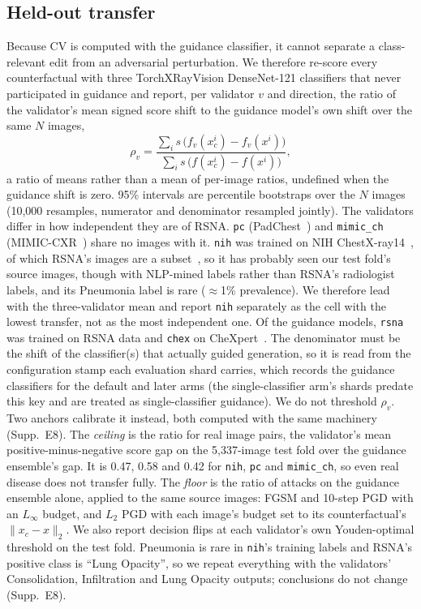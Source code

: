 \subsection{Held-out transfer}
\label{sec:transfer}

Because CV is computed with the guidance classifier, it cannot separate a class-relevant edit from an adversarial perturbation. We therefore re-score every counterfactual with three TorchXRayVision DenseNet-121 classifiers that never participated in guidance and report, per validator $v$ and direction, the ratio of the validator's mean signed score shift to the guidance model's own shift over the same $N$ images,
\begin{equation}
\rho_v = \frac{\sum_i s\,\big(f_v(x^i_c) - f_v(x^i)\big)}{\sum_i s\,\big(f(x^i_c) - f(x^i)\big)},
\label{eq:transfer}
\end{equation}
a ratio of means rather than a mean of per-image ratios, undefined when the guidance shift is zero. 95\% intervals are percentile bootstraps over the $N$ images (10{,}000 resamples, numerator and denominator resampled jointly).
The validators differ in how independent they are of RSNA. \texttt{pc} (PadChest~\cite{bustos2020padchest}) and \texttt{mimic\_ch} (MIMIC-CXR~\cite{johnson2019mimic}) share no images with it. \texttt{nih} was trained on NIH ChestX-ray14~\cite{wang2017chestxray8}, of which RSNA's images are a subset~\cite{shih2019augmenting}, so it has probably seen our test fold's source images, though with NLP-mined labels rather than RSNA's radiologist labels, and its Pneumonia label is rare ($\approx$1\% prevalence). We therefore lead with the three-validator mean and report \texttt{nih} separately as the cell with the lowest transfer, not as the most independent one. Of the guidance models, \texttt{rsna} was trained on RSNA data and \texttt{chex} on CheXpert~\cite{irvin2019chexpert}. The denominator must be the shift of the classifier(s) that actually guided generation, so it is read from the configuration stamp each evaluation shard carries, which records the guidance classifiers for the default and later arms (the single-classifier arm's shards predate this key and are treated as single-classifier guidance).
We do not threshold $\rho_v$. Two anchors calibrate it instead, both computed with the same machinery (Supp.~E8). The \emph{ceiling} is the ratio for real image pairs, the validator's mean positive-minus-negative score gap on the 5{,}337-image test fold over the guidance ensemble's gap. It is 0.47, 0.58 and 0.42 for \texttt{nih}, \texttt{pc} and \texttt{mimic\_ch}, so even real disease does not transfer fully. The \emph{floor} is the ratio of attacks on the guidance ensemble alone, applied to the same source images: FGSM and 10-step PGD with an $L_\infty$ budget, and $L_2$ PGD with each image's budget set to its counterfactual's $\|x_c - x\|_2$. We also report decision flips at each validator's own Youden-optimal threshold on the test fold. Pneumonia is rare in \texttt{nih}'s training labels and RSNA's positive class is ``Lung Opacity'', so we repeat everything with the validators' Consolidation, Infiltration and Lung Opacity outputs; conclusions do not change (Supp.~E8).

